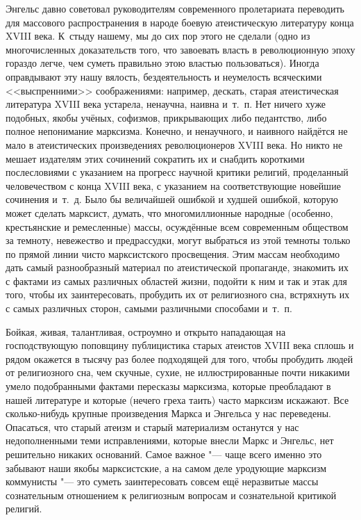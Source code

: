 Энгельс давно советовал руководителям современного пролетариата переводить
для массового распространения в народе боевую атеистическую литературу
конца XVIII века. К~стыду
нашему, мы до сих пор этого не сделали (одно из многочисленных
доказательств того, что завоевать власть в революционную эпоху гораздо
легче, чем суметь правильно этою властью пользоваться). Иногда
оправдывают эту нашу вялость, бездеятельность и неумелость всяческими
<<выспренними>> соображениями: например, дескать, старая атеистическая
литература XVIII века устарела, ненаучна, наивна и~т.~п. Нет ничего хуже
подобных, якобы учёных, софизмов, прикрывающих либо педантство, либо
полное непонимание марксизма. Конечно, и ненаучного, и наивного найдётся
не мало в атеистических произведениях революционеров XVIII века. Но
никто не мешает издателям этих сочинений сократить их и снабдить
короткими послесловиями с указанием на прогресс научной критики религий,
проделанный человечеством с конца XVIII века, с указанием на
соответствующие новейшие сочинения и~т.~д. Было бы величайшей ошибкой и
худшей ошибкой, которую может сделать марксист, думать, что многомиллионные
народные (особенно, крестьянские и ремесленные) массы, осуждённые всем
современным обществом за темноту, невежество и предрассудки, могут
выбраться из этой темноты только по прямой линии чисто марксистского
просвещения. Этим массам необходимо дать самый разнообразный материал по
атеистической пропаганде, знакомить их с фактами из самых различных
областей жизни, подойти к ним и так и этак для того, чтобы их
заинтересовать, пробудить их от религиозного сна, встряхнуть их с самых
различных сторон, самыми различными способами и~т.~п.

Бойкая, живая, талантливая, остроумно и открыто нападающая на господствующую
поповщину публицистика старых атеистов XVIII века сплошь и рядом окажется
в тысячу раз более подходящей для того, чтобы пробудить людей от религиозного
сна, чем скучные, сухие, не иллюстрированные почти никакими умело
подобранными фактами пересказы марксизма, которые преобладают в нашей
литературе и которые (нечего греха таить) часто марксизм искажают. Все
сколько-нибудь крупные произведения Маркса и Энгельса у нас
переведены. Опасаться, что старый атеизм и старый материализм останутся
у нас недополненными теми исправлениями, которые внесли Маркс и Энгельс,
нет решительно никаких оснований. Самое важное "--- чаще всего именно это
забывают наши якобы марксистские, а на самом деле уродующие марксизм
коммунисты "--- это суметь заинтересовать совсем ещё неразвитые массы
сознательным отношением к религиозным вопросам и сознательной
критикой религий.

